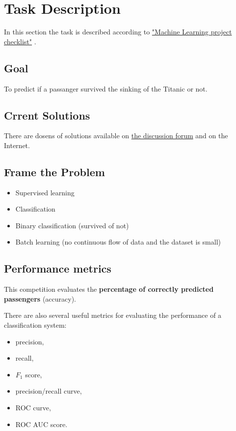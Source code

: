 \chapter{Task Description}
In this section the task is described according to 
\href{https://github.com/ageron/handson-ml/blob/master/ml-project-checklist.md}
{"Machine Learning project checklist"} \cite{hands_on_ml}.


\section{Goal}
To predict if a passanger survived the sinking of the Titanic or not.


\section{Crrent Solutions}
There are dosens of solutions available on 
\href{https://www.kaggle.com/c/titanic/discussion}{the discussion forum} 
and on the Internet.


\section{Frame the Problem}
\begin{itemize}
	\item Supervised learning
	\item Classification
	\item Binary classification (survived of not)
	\item Batch learning (no continuous flow of data and the dataset is 
	small)
\end{itemize}


\section{Performance metrics}
This competition evaluates the \textbf{percentage of correctly predicted
passengers} (accuracy).

There are also several useful metrics for evaluating the performance of 
a classification system:
\begin{itemize}
	\item precision,
	\item recall,
	\item $F_1$ score,
	\item precision/recall curve,
	\item ROC curve,
	\item ROC AUC score.
\end{itemize}


